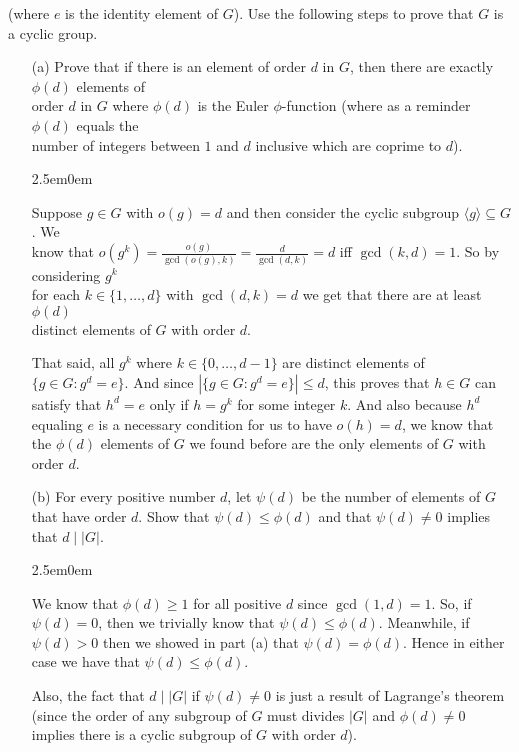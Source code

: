 \documentclass{book}
\newcommand{\HexOne}{%
   \color{Purple}%
   \fontsize{12}{13}\selectfont%
}
\newenvironment{myIndent}{%
   \begin{adjustwidth}{2.5em}{0em}%
}{%
   \end{adjustwidth}%
}
\newcommand{\divides}{\mathop{\mid}}
\newcommand{\retTwo}{\hfill\bigbreak}
\begin{document}
(where $e$ is the identity element of $G$). Use the following steps to prove that $G$ is a cyclic group.

\begin{enumerate}
	\item[(a)] Prove that if there is an element of order $d$ in $G$, then there are exactly $\phi(d)$ elements of\\ order $d$ in $G$ where $\phi(d)$ is the Euler $\phi$-function {\color{BrickRed}(where as a reminder $\phi(d)$ equals the\\ number of integers between $1$ and $d$ inclusive which are coprime to $d$)}.
	
	\begin{myIndent}\HexOne
		Suppose $g \in G$ with $o(g) = d$ and then consider the cyclic subgroup $\langle g \rangle \subseteq G$. We\\ [1pt] know that $o(g^k) = \frac{o(g)}{\gcd(o(g), k)} = \frac{d}{\gcd(d, k)} = d$ iff $\gcd(k, d) = 1$. So by considering $g^k$\\ for each $k \in \{1, \ldots, d\}$ with $\gcd(d, k) = d$ we get that there are at least $\phi(d)$\\ [3pt] distinct elements of $G$ with order $d$.\newpage

		That said, all $g^k$ where $k \in \{0, \ldots, d - 1\}$ are distinct elements of $\{g \in G : g^d = e\}$. And since $|\{g \in G : g^d = e\}| \leq d$, this proves that $h \in G$ can satisfy that $h^d = e$ only if $h = g^k$ for some integer $k$. And also because $h^d$ equaling $e$ is a necessary condition for us to have $o(h) = d$, we know that the $\phi(d)$ elements of $G$ we found before are the only elements of $G$ with order $d$.\retTwo
	\end{myIndent}
	
	\item[(b)] For every positive number $d$, let $\psi(d)$ be the number of elements of $G$ that have order $d$. Show that $\psi(d) \leq \phi(d)$ and that $\psi(d) \neq 0$ implies that $d \divides |G|$.
	
	\begin{myIndent}\HexOne
		We know that $\phi(d) \geq 1$ for all positive $d$ since $\gcd(1, d) = 1$. So, if $\psi(d) = 0$, then we trivially know that $\psi(d) \leq \phi(d)$. Meanwhile, if $\psi(d) > 0$ then we showed in part (a) that $\psi(d) = \phi(d)$. Hence in either case we have that $\psi(d) \leq \phi(d)$.\retTwo

		Also, the fact that $d \divides |G|$ if $\psi(d) \neq 0$ is just a result of Lagrange's theorem (since the order of any subgroup of $G$ must divides $|G|$ and $\phi(d) \neq 0$ implies there is a cyclic subgroup of $G$ with order $d$).\retTwo
	\end{myIndent}
	

\end{enumerate}
\end{document}
